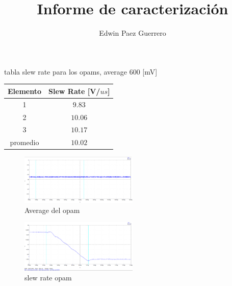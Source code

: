 \documentclass[12pt,a4paper]{article}
\author{Edwin Paez Guerrero }
\title{Informe de caracterización }
\begin{document}
tabla slew rate para los opams, average 600 [mV]

\begin{tabular}{|c|c|}
\hline 
\rule[-1ex]{0pt}{2.5ex} Elemento &  Slew Rate [V/$us$] \\ 
\hline 
\rule[-1ex]{0pt}{2.5ex} 1 & $9.83$ \\ 
\hline 
\rule[-1ex]{0pt}{2.5ex} 2 & $10.06$ \\ 
\hline 
\rule[-1ex]{0pt}{2.5ex} 3 & $10.17$ \\ 
\hline 
\rule[-1ex]{0pt}{2.5ex} promedio & $10.02$ \\ 
\hline 
\end{tabular} 

\begin{figure}
  \centering
    \includegraphics[width=0.5\textwidth]{average_opam.png}
  \caption{Average del opam}
  \label{fig:ejemplo}
\end{figure}

\begin{figure}
  \centering
    \includegraphics[width=0.5\textwidth]{slew_rate_opam.png}
  \caption{slew rate opam}
  \label{fig:ejemplo}
\end{figure}
\end{document}
